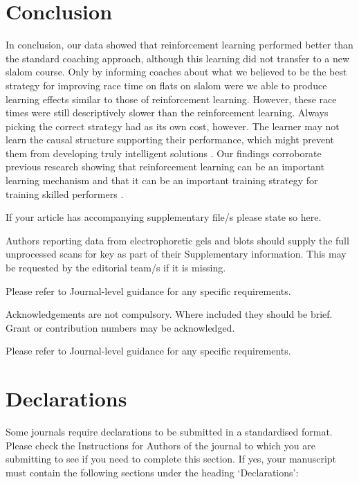 \documentclass[pdflatex,sn-mathphys-num]{sn-jnl}%
\theoremstyle{thmstyleone}%
\theoremstyle{thmstyletwo}%
\theoremstyle{thmstylethree}%
\begin{document}
\section{Conclusion}
In conclusion, our data showed that reinforcement learning performed better than the standard coaching approach, although this learning did not transfer to a new slalom course. Only by informing coaches about what we believed to be the best strategy for improving race time on flats on slalom were we able to produce learning effects similar to those of reinforcement learning. However, these race times were still descriptively slower than the reinforcement learning. Always picking the correct strategy had as its own cost, however. The learner may not learn the causal structure supporting their performance, which might prevent them from developing truly intelligent solutions \cite{ericsson_scientific_1998}. Our findings corroborate previous research showing that reinforcement learning can be an important learning mechanism \cite{hasson_reinforcement_2015} and that it can be an important training strategy for training skilled performers \cite{lohse_errors_2019}.



\backmatter


If your article has accompanying supplementary file/s please state so here. 

Authors reporting data from electrophoretic gels and blots should supply the full unprocessed scans for key as part of their Supplementary information. This may be requested by the editorial team/s if it is missing.

Please refer to Journal-level guidance for any specific requirements.


Acknowledgements are not compulsory. Where included they should be brief. Grant or contribution numbers may be acknowledged.

Please refer to Journal-level guidance for any specific requirements.

\section*{Declarations}

Some journals require declarations to be submitted in a standardised format. Please check the Instructions for Authors of the journal to which you are submitting to see if you need to complete this section. If yes, your manuscript must contain the following sections under the heading `Declarations':
\end{document}
